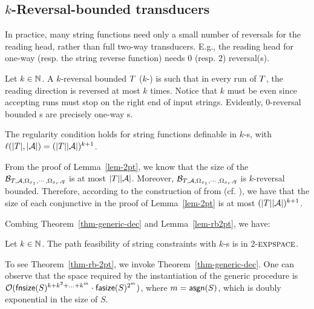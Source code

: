 
\vspace{-4mm}
\subsection{$k$-Reversal-bounded transducers} %
\label{subsec:krb}
\vspace{-1mm}

 
In practice, many string functions need only a small number of reversals for the reading head, rather than full two-way transducers. 
E.g., the reading head for one-way \PT{} (resp. the string reverse function) needs $0$ (resp. $2$) reversal(s).

Let $k \in \mathbb{N}$. A $k$-reversal bounded \PPT{} $T$ ($k$-\RBPPT{}) is such that in every run of $T$, the reading direction is reversed at most $k$ times. 
Notice that $k$ must be even since accepting runs must stop on the right end of input strings. 
Evidently, $0$-reversal bounded \PPT{}s are precisely one-way \PT{}s.   


%
\begin{lemma}\label{lem-rb2pt}
The regularity condition \prerec{} holds for string functions definable in $k$-\RBPPT{}s, with $\ell(|T|, |\mathcal{A}|) = (|T||\mathcal{A}|)^{k+1}$.
\end{lemma}

From the proof of Lemma~\ref{lem-2pt}, we know that the size of the \FFA{} $\mathcal{B}_{T, \mathcal{A}, \Omega_{x_1}, \cdots, \Omega_{x_r}, q}$  is at most $|T| |\mathcal{A}|$. Moreover, $\mathcal{B}_{T, \mathcal{A}, \Omega_{x_1}, \cdots, \Omega_{x_r}, q}$ is $k$-reversal bounded. Therefore, according to the construction of \FA{} from \FFA{}  (cf. \cite{HU79}), we have that the size of each conjunctive \FA{}  in the proof of Lemma~\ref{lem-2pt} is at most $ (|T||\mathcal{A}|)^{k+1}$. 

Combing Theorem~\ref{thm-generic-dec} and Lemma~\ref{lem-rb2pt}, we have:

\begin{theorem} \label{thm-rb-2pt}
Let  $k \in \mathbb{N}$. The path feasibility of string constraints with $k$-\RBPPT{}s is in 2-$\textsc{expspace}$. 
\end{theorem}
%
To see Theorem~\ref{thm-rb-2pt}, we invoke Theorem~\ref{thm-generic-dec}. One can observe that the space required by the instantiation of the generic procedure is $\mathcal{O}(\mathsf{fnsize}(S)^{k+k^2+...+k^m}\cdot  \mathsf{fasize}(S)^{2^m})$, where $m=\mathsf{asgn}(S)$, which is doubly exponential in the size of $S$. 





